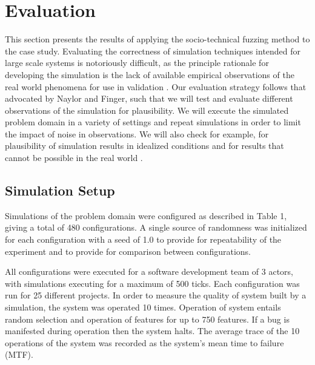 \documentclass{llncs}
\begin{document}

\section{Evaluation}


This section presents the results of applying the socio-technical fuzzing method to the case study.  Evaluating the
correctness of simulation techniques intended for large scale systems is notoriously difficult, as the principle
rationale for developing the simulation is the lack of available empirical observations of the real world phenomena for
use in validation \citet{naylor67verification}.  Our evaluation strategy follows that advocated by Naylor and Finger,
such that we will test and evaluate different observations of the simulation for plausibility.  We will execute the
simulated problem domain in a variety of settings and repeat simulations in order to limit the impact of noise in
observations.  We will also check for example, for plausibility of simulation results in idealized conditions
\cite{shull11assuring} and for results that cannot be possible in the real world \cite{weyuker82testing}.


\subsection{Simulation Setup}


Simulations of the problem domain were configured as described in Table 1, giving a total of 480 configurations.  A
single source of randomness was initialized for each configuration with a seed of 1.0 to provide for repeatability of
the experiment and to provide for comparison between configurations.

All configurations were executed for a software development team of 3 actors, with simulations executing for a maximum
of 500 ticks.  Each configuration was run for 25 different projects.  In order to measure the quality of system built by
a simulation, the system was operated 10 times.  Operation of system entails random selection and operation of features
for up to 750 features.  If a bug is manifested during operation then the system halts.  The average trace of the 10
operations of the system was recorded as the system's mean time to failure (MTF).
\end{document}
